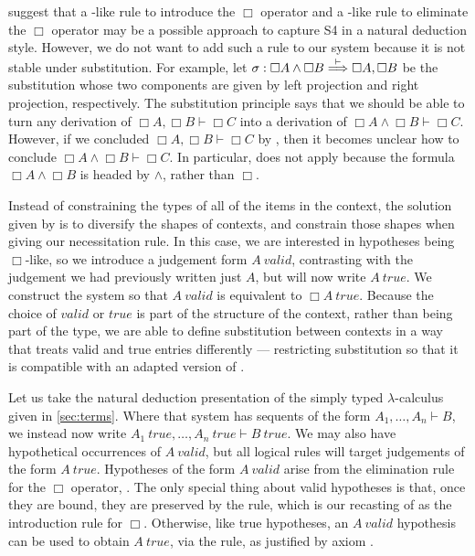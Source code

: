  suggest that a -like rule to
introduce the $\Box$ operator and a -like rule to eliminate the
$\Box$ operator may be a possible approach to capture S4 in a natural deduction
style.
However, we do not want to add such a rule to our system because it is not
stable under substitution.
For example, let
$\sigma : \Box A \wedge \Box B \stackrel{\vdash}\Longrightarrow \Box A, \Box B$ be the substitution
whose two components are given by left projection and right projection,
respectively.
The substitution principle says that we should be able to turn any derivation of
$\Box A, \Box B \vdash \Box C$ into a derivation of
$\Box A \wedge \Box B \vdash \Box C$.
However, if we concluded $\Box A, \Box B \vdash \Box C$ by ,
then it becomes unclear how to conclude $\Box A \wedge \Box B \vdash \Box C$.
In particular,  does not apply because the formula
$\Box A \wedge \Box B$ is headed by $\wedge$, rather than $\Box$.

Instead of constraining the types of all of the items in the context, the
solution given by \citet{judgmental} is to diversify the shapes of contexts, and
constrain those shapes when giving our necessitation rule.
In this case, we are interested in hypotheses being $\Box$-like, so we introduce
a judgement form $A~\mathit{valid}$, contrasting with the judgement we had
previously written just $A$, but will now write $A~\mathit{true}$.
We construct the system so that $A~\mathit{valid}$ is equivalent to
$\Box A~\mathit{true}$.
Because the choice of $\mathit{valid}$ or $\mathit{true}$ is part of the
structure of the context, rather than being part of the type, we are able to
define substitution between contexts in a way that treats valid and true entries
differently --- restricting substitution so that it is compatible with an
adapted version of .

Let us take the natural deduction presentation of the simply typed
$\lambda$-calculus given in \cref{sec:terms}.
Where that system has sequents of the form $A_1, \ldots, A_n \vdash B$, we
instead now write
$A_1~\mathit{true}, \ldots, A_n~\mathit{true} \vdash B~\mathit{true}$.
We may also have hypothetical occurrences of $A~\mathit{valid}$, but all logical
rules will target judgements of the form $A~\mathit{true}$.
Hypotheses of the form $A~\mathit{valid}$ arise from the elimination rule for
the $\Box$ operator, .
The only special thing about valid hypotheses is that, once they are bound, they
are preserved by the  rule, which is our recasting of
 as the introduction rule for $\Box$.
Otherwise, like true hypotheses, an $A~\mathit{valid}$ hypothesis can be used to
obtain $A~\mathit{true}$, via the  rule, as justified by axiom
.

